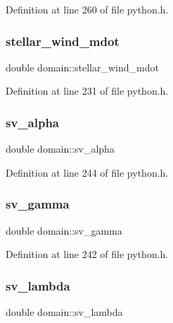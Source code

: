 Definition at line 260 of file python.\+h.

\mbox{\label{structdomain_a970f4797bdf26152c846b84b31ae5aad}} 
\subsubsection{\texorpdfstring{stellar\+\_\+wind\+\_\+mdot}{stellar\_wind\_mdot}}
{\footnotesize\ttfamily double domain\+::stellar\+\_\+wind\+\_\+mdot}



Definition at line 231 of file python.\+h.

\mbox{\label{structdomain_aba459d2b7c4baf62a69ef13fdb39efde}} 
\subsubsection{\texorpdfstring{sv\+\_\+alpha}{sv\_alpha}}
{\footnotesize\ttfamily double domain\+::sv\+\_\+alpha}



Definition at line 244 of file python.\+h.

\mbox{\label{structdomain_ab5195a9a179b03ca126f2f0f5beef95a}} 
\subsubsection{\texorpdfstring{sv\+\_\+gamma}{sv\_gamma}}
{\footnotesize\ttfamily double domain\+::sv\+\_\+gamma}



Definition at line 242 of file python.\+h.

\mbox{\label{structdomain_a813f3ba19f355859ca42acb3c2292d24}} 
\subsubsection{\texorpdfstring{sv\+\_\+lambda}{sv\_lambda}}
{\footnotesize\ttfamily double domain\+::sv\+\_\+lambda}



